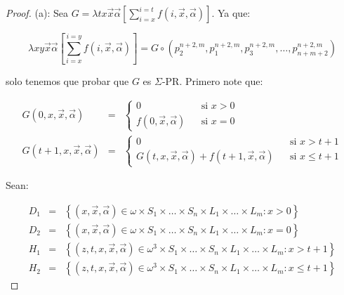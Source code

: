   \begin{proof}
    \par (a): Sea $G = \lambda tx\vec{x}\vec{\alpha}\left[\sum_{i=x}^{i=t} f(i, \vec{x}, \vec{\alpha})\right]$. Ya que:

    \[
      \lambda xy\vec{x}\vec{\alpha}\left[\sum_{i=x}^{i=y} f(i, \vec{x}, \vec{\alpha})\right] = G \circ \left(
      p_{2}^{n+2,m}, p_{1}^{n+2,m}, p_{3}^{n+2,m}, \dotsc, p_{n+m+2}^{n+2,m}\right)
    \]

    \par solo tenemos que probar que $G$ es $\Sigma$-PR. Primero note que:

    \begin{eqnarray}
      \nonumber G(0,x,\vec{x},\vec{\alpha}) &=& \left\{
        \begin{array}{lll}
          0 && \text{si } x > 0 \\
          f(0,\vec{x},\vec{\alpha}) && \text{si } x = 0
        \end{array}\right. \\
      \nonumber G(t+1,x,\vec{x},\vec{\alpha}) &=& \left\{
        \begin{array}{lll}
          0 && \text{si } x > t+1 \\
          G(t,x,\vec{x},\vec{\alpha}) + f(t+1,\vec{x},\vec{\alpha}) && \text{si } x \leq t+1
        \end{array} \right.
    \end{eqnarray}

    \par Sean:

    \begin{eqnarray}
      \nonumber D_{1} &=& \left\{(x,\vec{x},\vec{\alpha}) \in \omega \times S_{1} \times \dotsc \times S_{n} \times
        L_{1} \times \dotsc \times L_{m}: x > 0 \right\} \\
      \nonumber D_{2} &=& \left\{(x,\vec{x},\vec{\alpha}) \in \omega \times S_{1} \times \dotsc \times S_{n} \times
        L_{1} \times \dotsc \times L_{m}: x = 0 \right\} \\
      \nonumber H_{1} &=& \left\{(z,t,x,\vec{x},\vec{\alpha}) \in \omega^{3} \times S_{1} \times \dotsc \times S_{n}
        \times L_{1} \times \dotsc \times L_{m}: x > t+1\right\} \\
      \nonumber H_{2} &=& \left\{(z,t,x,\vec{x},\vec{\alpha}) \in \omega^{3} \times S_{1} \times \dotsc \times S_{n}
        \times L_{1} \times \dotsc \times L_{m}: x \leq t+1\right\}
    \end{eqnarray}


\end{proof}
